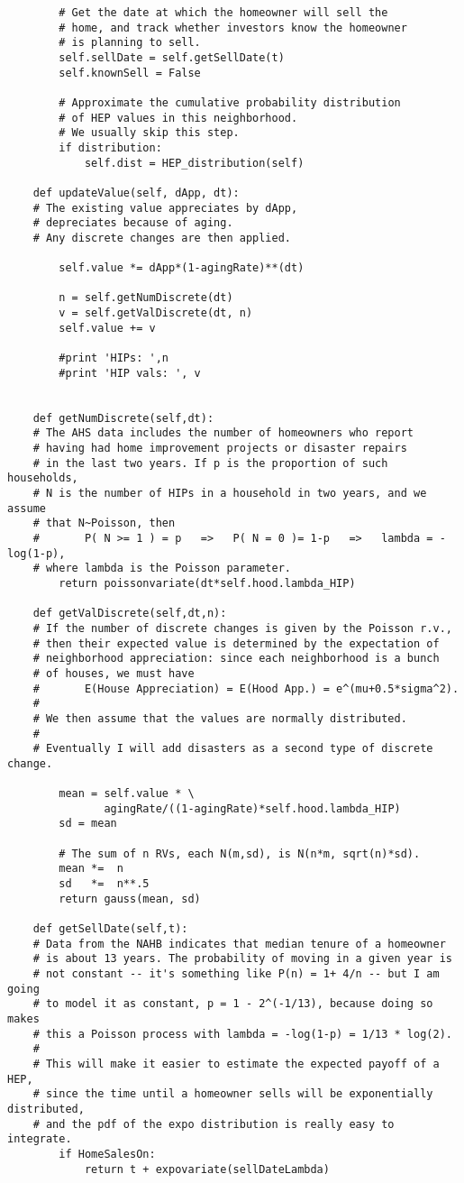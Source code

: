 \begin{lstlisting}
        # Get the date at which the homeowner will sell the
        # home, and track whether investors know the homeowner
        # is planning to sell.
        self.sellDate = self.getSellDate(t)
        self.knownSell = False
        
        # Approximate the cumulative probability distribution
        # of HEP values in this neighborhood.
        # We usually skip this step.
        if distribution:
            self.dist = HEP_distribution(self)

    def updateValue(self, dApp, dt):
    # The existing value appreciates by dApp,
    # depreciates because of aging.
    # Any discrete changes are then applied.
                
        self.value *= dApp*(1-agingRate)**(dt)
        
        n = self.getNumDiscrete(dt)
        v = self.getValDiscrete(dt, n)
        self.value += v

        #print 'HIPs: ',n
        #print 'HIP vals: ', v
        

    def getNumDiscrete(self,dt):
    # The AHS data includes the number of homeowners who report
    # having had home improvement projects or disaster repairs
    # in the last two years. If p is the proportion of such households,
    # N is the number of HIPs in a household in two years, and we assume
    # that N~Poisson, then
    #       P( N >= 1 ) = p   =>   P( N = 0 )= 1-p   =>   lambda = -log(1-p),
    # where lambda is the Poisson parameter.
        return poissonvariate(dt*self.hood.lambda_HIP)

    def getValDiscrete(self,dt,n):
    # If the number of discrete changes is given by the Poisson r.v.,
    # then their expected value is determined by the expectation of
    # neighborhood appreciation: since each neighborhood is a bunch
    # of houses, we must have
    #       E(House Appreciation) = E(Hood App.) = e^(mu+0.5*sigma^2).
    #
    # We then assume that the values are normally distributed.
    #
    # Eventually I will add disasters as a second type of discrete change.
    
        mean = self.value * \
               agingRate/((1-agingRate)*self.hood.lambda_HIP)
        sd = mean

        # The sum of n RVs, each N(m,sd), is N(n*m, sqrt(n)*sd).
        mean *=  n
        sd   *=  n**.5
        return gauss(mean, sd)

    def getSellDate(self,t):
    # Data from the NAHB indicates that median tenure of a homeowner
    # is about 13 years. The probability of moving in a given year is
    # not constant -- it's something like P(n) = 1+ 4/n -- but I am going
    # to model it as constant, p = 1 - 2^(-1/13), because doing so makes
    # this a Poisson process with lambda = -log(1-p) = 1/13 * log(2).
    #
    # This will make it easier to estimate the expected payoff of a HEP,
    # since the time until a homeowner sells will be exponentially distributed,
    # and the pdf of the expo distribution is really easy to integrate.
        if HomeSalesOn:
            return t + expovariate(sellDateLambda)


\end{lstlisting}
